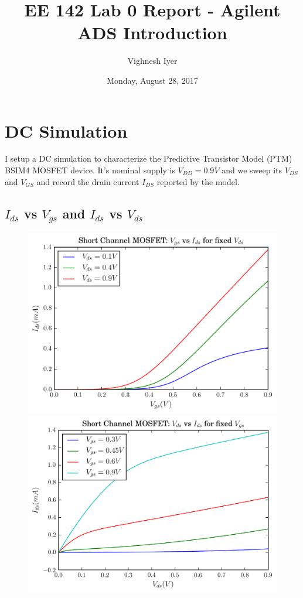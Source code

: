 \documentclass[11pt]{article}
\begin{document}
\title{EE 142 Lab 0 Report - Agilent ADS Introduction}

\author{Vighnesh Iyer}
\date{Monday, August 28, 2017}
\maketitle

\section{DC Simulation}
I setup a DC simulation to characterize the Predictive Transistor Model (PTM) BSIM4 MOSFET device. It's nominal supply is $V_{DD} = 0.9V$ and we sweep its $V_{DS}$ and $V_{GS}$ and record the drain current $I_{DS}$ reported by the model.

\subsection{$I_{ds}$ vs $V_{gs}$ and $I_{ds}$ vs $V_{ds}$}
\begin{figure}[H]
	\includegraphics[width=\linewidth]{images/short_channel_vgs_vs_ids.png}
	\endminipage\hfill
	\includegraphics[width=\linewidth]{images/short_channel_vds_vs_ids.png}
	\endminipage
\end{figure}
\end{document}
